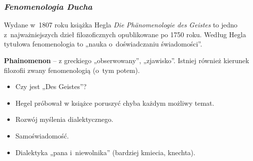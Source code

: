 \documentclass[10pt,t]{beamer}
\begin{document}
\begin{frame}
  \frametitle{\textit{Fenomenologia Ducha}}


  Wydane w~1807 roku książka Hegla \textit{Die Ph\"{a}nomenologie
  des Geistes} to jedno z~najważniejszych dzieł filozoficznych
  opublikowane po 1750 roku. Według Hegla tytułowa fenomenologia to
  „nauka o~doświadczaniu świadomości”.

  \textbf{Phainomenon} -- z greckiego „obserwowany”, „zjawisko”.
  Istniej również kierunek filozofii zwany fenomenologią (o~tym
  potem).

  \begin{itemize}

  \item Czy jest „Des Geistes”?

  \item Hegel próbował w książce poruszyć chyba każdym możliwy
    temat.

  \item Rozwój myślenia dialektycznego.

  \item Samoświadomość.

  \item Dialektyka „pana i~niewolnika” (bardziej kmiecia, knechta).

  \end{itemize}

\end{frame}
\end{document}
